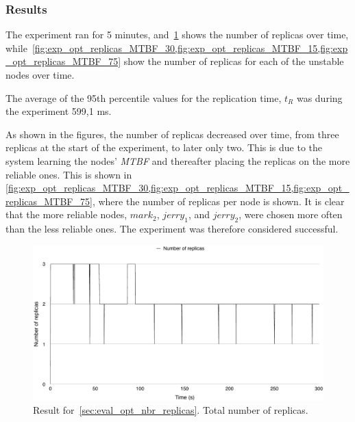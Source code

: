 \documentclass{cslthse-msc}
\begin{document}
\subsubsection*{Results}
The experiment ran for 5 minutes, and~\cref{fig:exp_opt_replicas_total} shows the number of replicas over time, while~\cref{fig:exp_opt_replicas_MTBF_30,fig:exp_opt_replicas_MTBF_15,fig:exp_opt_replicas_MTBF_75} show the number of replicas for each of the unstable nodes over time.

The average of the 95th percentile values for the replication time, $t_R$ was during the experiment 599,1 ms.

As shown in the figures, the number of replicas decreased over time, from three replicas at the start of the experiment, to later only two. This is due to the system learning the nodes' \emph{MTBF} and thereafter placing the replicas on the more reliable ones. This is shown in \cref{fig:exp_opt_replicas_MTBF_30,fig:exp_opt_replicas_MTBF_15,fig:exp_opt_replicas_MTBF_75}, where the number of replicas per node is shown. It is clear that the more reliable nodes, $mark_2$, $jerry_1$, and $jerry_2$, were chosen more often than the less reliable ones. The experiment was therefore considered successful.

\begin{figure}[!hbt]
\centering
\includegraphics[scale=0.5]{images/results/optimal_replicas/total.pdf}
\caption[Total number of replicas in~\cref{sec:eval_opt_nbr_replicas}]{Result for~\cref{sec:eval_opt_nbr_replicas}. Total number of replicas.} \label{fig:exp_opt_replicas_total}
\end{figure}
\end{document}

